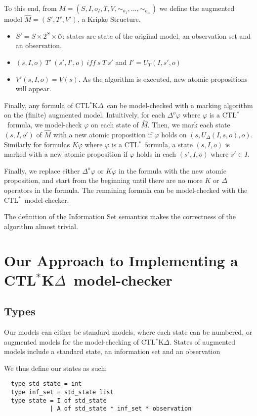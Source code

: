 \documentclass[dvipsnames]{acmart}
\def\ctls{CTL$^{*}$}
\def\ctlskd{CTL$^{*}$K$\Delta$}
\def\K{\mathit{K}}
\def\D#1{\Delta^{#1}}
\def\eqstate#1{\sim_{#1}}
\def\iff{\ \mathit{iff}\ }
\def\UD{U_{\Delta}}
\def\UT{U_T}
\begin{document}
To this end, from $M=(S,I,o_I,T,V,\eqstate{o_1},\dots,\eqstate{o_m})$ we define the augmented model $\hat{M}=(S',T',V')$, a Kripke Structure.
\begin{itemize}
\item $S'=S\times 2^{S}\times \mathcal{O}$: states are state of the original model, an observation set and an observation.
\item $(s,I,o)~T'~(s',I',o)\iff s~T~s'$ and $I'=\UT(I,s',o)$
\item $V'(s,I,o)=V(s)$. As the algorithm is executed, new atomic propositions will appear.
\end{itemize}

Finally, any formula of \ctlskd\ can be model-checked with a marking algorithm on the (finite) augmented model.
Intuitively, for each $\D{o}\varphi$ where $\varphi$ is a \ctls\ formula, we model-check $\varphi$ on each state of $\hat{M}$.
Then, we mark each state $(s,I,o')$ of $\hat{M}$ with a new atomic proposition if $\varphi$ holds on $(s,\UD(I,s,o),o)$.
Similarly for formulas $\K\varphi$ where $\varphi$ is a \ctls\ formula, a state $(s,I,o)$ is marked with a new atomic proposition if $\varphi$ holds in each $(s',I,o)$ where $s'\in I$.

Finally, we replace either $\D{o}\varphi$ or $\K\varphi$ in the formula with the new atomic proposition, and start from the beginning until there are no more $\K$ or $\Delta$ operators in the formula. The remaining formula can be model-checked with the \ctls\ model-checker.

The definition of the Information Set semantics makes the correctness of the algorithm almost trivial.

\section{Our Approach to Implementing a \ctlskd\ model-checker}

\subsection{Types}
Our models can either be standard models, where each state can be numbered, or augmented models for the model-checking of \ctlskd.
States of augmented models include a standard state, an information set and an observation

We thus define our states as such:
\begin{lstlisting}
  type std_state = int
  type inf_set = std_state list
  type state = I of std_state
             | A of std_state * inf_set * observation
\end{lstlisting}
\end{document}
